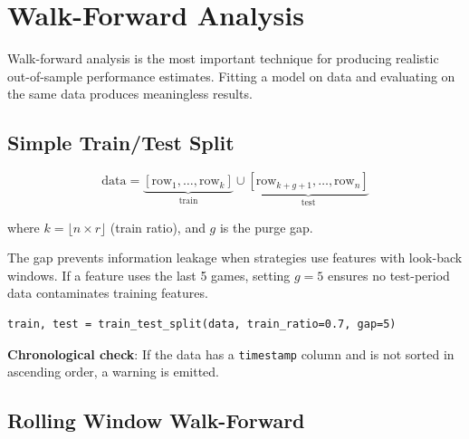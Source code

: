 \documentclass[12pt,a4paper]{report}
\theoremstyle{definition}
\newcommand{\code}[1]{\texttt{#1}}
\begin{document}
\chapter{Walk-Forward Analysis}
\label{ch:walk-forward}

Walk-forward analysis is the most important technique for producing realistic out-of-sample performance estimates. Fitting a model on data and evaluating on the same data produces meaningless results.

\section{Simple Train/Test Split}
\label{sec:train-test}

\begin{equation}
    \text{data} = \underbrace{[\text{row}_1, \ldots, \text{row}_k]}_{\text{train}} \cup \underbrace{[\text{row}_{k+g+1}, \ldots, \text{row}_n]}_{\text{test}}
\end{equation}

where $k = \lfloor n \times r \rfloor$ (train ratio), and $g$ is the purge gap.

The gap prevents information leakage when strategies use features with look-back windows. If a feature uses the last 5 games, setting $g = 5$ ensures no test-period data contaminates training features.

\begin{lstlisting}[caption={Train/test split usage.}]
train, test = train_test_split(data, train_ratio=0.7, gap=5)
\end{lstlisting}

\textbf{Chronological check}: If the data has a \code{timestamp} column and is not sorted in ascending order, a warning is emitted.

\section{Rolling Window Walk-Forward}
\label{sec:rolling-wf}
\end{document}
